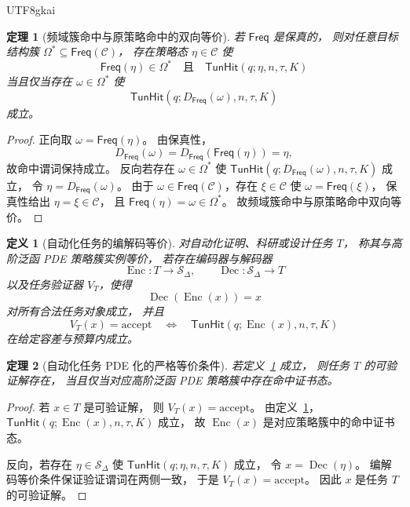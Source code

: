 \documentclass[12pt]{article}
\newtheorem{definition}{定义}[section]
\newtheorem{theorem}{定理}[section]
\newcommand{\TunHit}{\mathsf{TunHit}}
\newcommand{\Freq}{\mathsf{Freq}}
\newcommand{\Enc}{\operatorname{Enc}}
\newcommand{\Dec}{\operatorname{Dec}}
\begin{document}
\begin{CJK*}{UTF8}{gkai}
\begin{theorem}[频域簇命中与原策略命中的双向等价]
\label{thm:tex53-frequency-hit-equivalence}
若 \(\Freq\) 是保真的，
则对任意目标结构簇 \(\Omega^\ast\subseteq\Freq(\mathcal C)\)，
存在策略态 \(\eta\in\mathcal C\) 使
\[
  \Freq(\eta)\in\Omega^\ast
  \quad\text{且}\quad
  \TunHit(q;\eta,n,\tau,K)
\]
当且仅当存在 \(\omega\in\Omega^\ast\) 使
\[
  \TunHit(q;D_\Freq(\omega),n,\tau,K)
\]
成立。
\end{theorem}

\begin{proof}
正向取 \(\omega=\Freq(\eta)\)。
由保真性，
\[
  D_\Freq(\omega)=D_\Freq(\Freq(\eta))=\eta,
\]
故命中谓词保持成立。
反向若存在 \(\omega\in\Omega^\ast\) 使
\(\TunHit(q;D_\Freq(\omega),n,\tau,K)\) 成立，
令 \(\eta=D_\Freq(\omega)\)。
由于 \(\omega\in\Freq(\mathcal C)\)，存在 \(\xi\in\mathcal C\) 使 \(\omega=\Freq(\xi)\)，
保真性给出 \(\eta=\xi\in\mathcal C\)，
且 \(\Freq(\eta)=\omega\in\Omega^\ast\)。
故频域簇命中与原策略命中双向等价。
\end{proof}

\begin{definition}[自动化任务的编解码等价]
\label{def:tex53-task-codec}
对自动化证明、科研或设计任务 \(T\)，
称其与高阶泛函 PDE 策略簇实例等价，
若存在编码器与解码器
\[
  \Enc:T\to\mathcal S_\Delta,
  \qquad
  \Dec:\mathcal S_\Delta\to T
\]
以及任务验证器 \(V_T\)，使得
\[
  \Dec(\Enc(x))=x
\]
对所有合法任务对象成立，
并且
\[
  V_T(x)=\mathrm{accept}
  \quad\Longleftrightarrow\quad
  \TunHit(q;\Enc(x),n,\tau,K)
\]
在给定容差与预算内成立。
\end{definition}

\begin{theorem}[自动化任务 PDE 化的严格等价条件]
\label{thm:tex53-task-pde-equivalence}
若定义~\ref{def:tex53-task-codec} 成立，
则任务 \(T\) 的可验证解存在，
当且仅当对应高阶泛函 PDE 策略簇中存在命中证书态。
\end{theorem}

\begin{proof}
若 \(x\in T\) 是可验证解，
则 \(V_T(x)=\mathrm{accept}\)。
由定义~\ref{def:tex53-task-codec}，
\(\TunHit(q;\Enc(x),n,\tau,K)\) 成立，
故 \(\Enc(x)\) 是对应策略簇中的命中证书态。

反向，若存在 \(\eta\in\mathcal S_\Delta\) 使
\(\TunHit(q;\eta,n,\tau,K)\) 成立，
令 \(x=\Dec(\eta)\)。
编解码等价条件保证验证谓词在两侧一致，
于是 \(V_T(x)=\mathrm{accept}\)。
因此 \(x\) 是任务 \(T\) 的可验证解。
\end{proof}


\end{CJK*}
\end{document}

